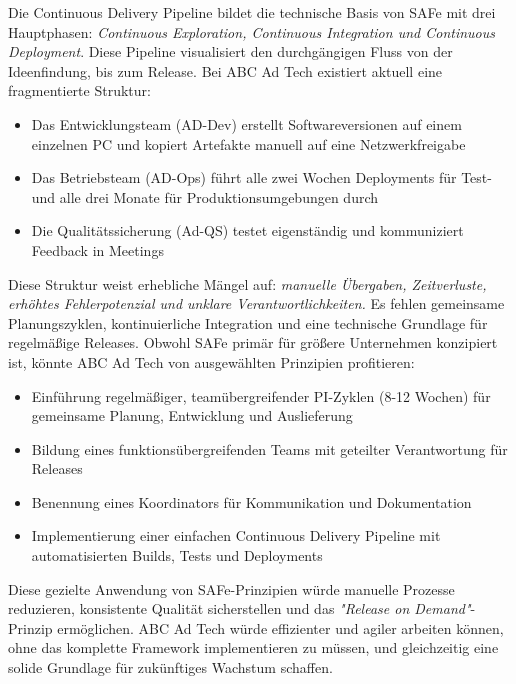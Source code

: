 Die Continuous Delivery Pipeline bildet die technische Basis von SAFe mit drei Hauptphasen:
\textit{Continuous Exploration, Continuous Integration und Continuous Deployment}. Diese Pipeline
visualisiert den durchgängigen Fluss von der Ideenfindung, bis zum Release. \cite{atlassian_safe,apwide_safe}
\linebreak
Bei ABC Ad Tech existiert aktuell eine fragmentierte Struktur:
\begin{itemize}
    \item Das Entwicklungsteam (AD-Dev) erstellt Softwareversionen auf einem einzelnen PC
    und kopiert Artefakte manuell auf eine Netzwerkfreigabe
    \item Das Betriebsteam (AD-Ops) führt alle zwei Wochen Deployments für Test- und alle drei
    Monate für Produktionsumgebungen durch
    \item Die Qualitätssicherung (Ad-QS) testet eigenständig und kommuniziert Feedback in Meetings
\end{itemize}
Diese Struktur weist erhebliche Mängel auf: \textit{manuelle Übergaben, Zeitverluste, erhöhtes
Fehlerpotenzial und unklare Verantwortlichkeiten.}
Es fehlen gemeinsame Planungszyklen, kontinuierliche Integration und eine technische Grundlage
für regelmäßige Releases.
Obwohl SAFe primär für größere Unternehmen konzipiert ist, könnte ABC Ad Tech von ausgewählten
Prinzipien profitieren: \\
\cite{atlassian_safe,apwide_safe}
\begin{itemize}
    \item Einführung regelmäßiger, teamübergreifender PI-Zyklen (8-12 Wochen) für gemeinsame
    Planung, Entwicklung und Auslieferung
    \item Bildung eines funktionsübergreifenden Teams mit geteilter Verantwortung für Releases
    \item Benennung eines Koordinators für Kommunikation und Dokumentation
    \item Implementierung einer einfachen Continuous Delivery Pipeline mit automatisierten Builds,
    Tests und Deployments
\end{itemize}
Diese gezielte Anwendung von SAFe-Prinzipien würde manuelle Prozesse reduzieren, konsistente
Qualität sicherstellen und das \textit{"Release on Demand"}-Prinzip ermöglichen. ABC Ad Tech würde
effizienter und agiler arbeiten können, ohne das komplette Framework implementieren zu müssen, und
gleichzeitig eine solide Grundlage für zukünftiges Wachstum schaffen.



